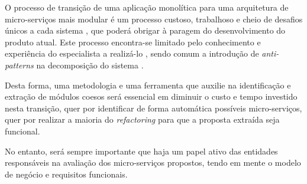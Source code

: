     O processo de transição de uma aplicação monolítica para uma arquitetura de micro-serviços mais modular é um processo custoso, trabalhoso e cheio de desafios únicos a cada sistema \citep{migratinglegacykazanavicius19}, que poderá obrigar à paragem do desenvolvimento do produto atual. Este processo encontra-se limitado pelo conhecimento e experiência do especialista a realizá-lo \citep{pahl16_ms_systematic_mapping}, sendo comum a introdução de \textit{anti-patterns} na decomposição do sistema \citep{fritzsch19_migration_in_industry}.
    
    Desta forma, uma metodologia e uma ferramenta que auxilie na identificação e extração de módulos coesos será essencial em diminuir o custo e tempo investido nesta transição, quer por identificar de forma automática possíveis micro-serviços, quer por realizar a maioria do \textit{refactoring} para que a proposta extraída seja funcional. 
    

    No entanto, será sempre importante que haja um papel ativo das entidades responsáveis na avaliação dos micro-serviços propostos, tendo em mente o modelo de negócio e requisitos funcionais.
    







